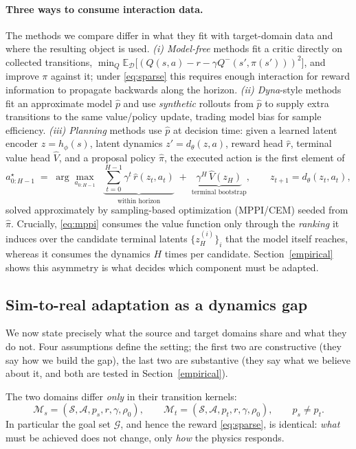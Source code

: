 \paragraph{Three ways to consume interaction data.}
The methods we compare differ in what they fit with target-domain data and
where the resulting object is used.
\emph{(i) Model-free} methods fit a critic directly on collected transitions,
$\min_{Q} \mathbb{E}_{\mathcal{D}} \big[ (Q(s,a) - r - \gamma
Q^{-}(s', \pi(s')))^2 \big]$, and improve $\pi$ against it; under
\eqref{eq:sparse} this requires enough interaction for reward information to
propagate backwards along the horizon.
\emph{(ii) Dyna}-style methods fit an approximate model $\hat{p}$ and use
\emph{synthetic} rollouts from $\hat{p}$ to supply extra transitions to the
same value/policy update, trading model bias for sample efficiency.
\emph{(iii) Planning} methods use $\hat{p}$ at decision time: given a learned
latent encoder $z = h_\phi(s)$, latent dynamics $z' = d_\theta(z,a)$, reward
head $\hat{r}$, terminal value head $\hat{V}$, and a proposal policy
$\hat{\pi}$, the executed action is the first element of
\begin{equation}
a_{0:H-1}^{\star} \;=\; \arg\max_{a_{0:H-1}}
\;\; \underbrace{\sum_{t=0}^{H-1} \gamma^{t}\, \hat{r}(z_t, a_t)}_{\text{within horizon}}
\;+\; \underbrace{\gamma^{H}\, \hat{V}(z_H)}_{\text{terminal bootstrap}},
\qquad z_{t+1} = d_\theta(z_t, a_t),
\label{eq:mppi}
\end{equation}
solved approximately by sampling-based optimization (MPPI/CEM) seeded from
$\hat{\pi}$. Crucially, \eqref{eq:mppi} consumes the value function only
through the \emph{ranking} it induces over the candidate terminal latents
$\{z_H^{(i)}\}_i$ that the model itself reaches, whereas it consumes the
dynamics $H$ times per candidate. Section~\ref{empirical} shows this
asymmetry is what decides which component must be adapted.

\subsection{Sim-to-real adaptation as a dynamics gap}
\label{sec:setting}

We now state precisely what the source and target domains share and what they
do not. Four assumptions define the setting; the first two are constructive
(they say how we build the gap), the last two are substantive (they say what we
believe about it, and both are tested in Section~\ref{empirical}).

\begin{assumption}
\label{as:gap}
The two domains differ \emph{only} in their transition kernels:
\begin{equation}
\mathcal{M}_s = (\mathcal{S}, \mathcal{A}, p_s, r, \gamma, \rho_0),
\qquad
\mathcal{M}_t = (\mathcal{S}, \mathcal{A}, p_t, r, \gamma, \rho_0),
\qquad p_s \neq p_t .
\end{equation}
In particular the goal set $\mathcal{G}$, and hence the reward
\eqref{eq:sparse}, is identical: \emph{what} must be achieved does not change,
only \emph{how} the physics responds.
\end{assumption}

